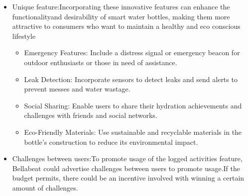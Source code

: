 \documentclass[
]{article}
\providecommand{\tightlist}{%
  \setlength{\itemsep}{0pt}\setlength{\parskip}{0pt}}
\begin{document}
\begin{itemize}
\tightlist
\item
  Unique feature:Incorporating these innovative features can enhance the
  functionalityand desirability of smart water bottles, making them more
  attractive to consumers who want to maintain a healthy and eco
  conscious lifestyle

  \begin{itemize}
  \tightlist
  \item
    Emergency Features: Include a distress signal or emergency beacon
    for outdoor enthusiasts or those in need of assistance.
  \item
    Leak Detection: Incorporate sensors to detect leaks and send alerts
    to prevent messes and water wastage.
  \item
    Social Sharing: Enable users to share their hydration achievements
    and challenges with friends and social networks.
  \item
    Eco-Friendly Materials: Use sustainable and recyclable materials in
    the bottle's construction to reduce its environmental impact.
  \end{itemize}
\item
  Challenges between users:To promote usage of the logged activities
  feature, Bellabeat could advertise challenges between users to promote
  usage.If the budget permits, there could be an incentive involved with
  winning a certain amount of challenges.
\end{itemize}
\end{document}
